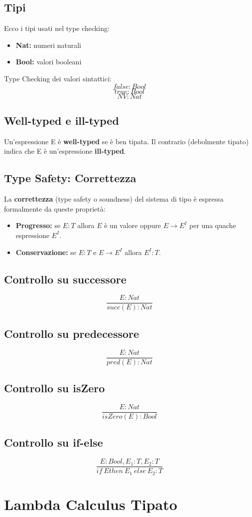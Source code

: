 \documentclass[12pt,a4paper]{article}
\let\oldsection\section
\renewcommand{\section}{\clearpage\oldsection}
\begin{document}
\subsection{Tipi}
Ecco i tipi usati nel type checking:
\begin{itemize}
  \item \textbf{Nat:} numeri naturali
  \item \textbf{Bool:} valori booleani
\end{itemize}
Type Checking dei valori sintattici:
\[
false: Bool
\]
\[
true: Bool
\]
\[
NV: Nat
\]
\subsection{Well-typed e ill-typed}
Un'espressione E è \textbf{well-typed} se è ben tipata. Il contrario (debolmente tipato) indica che E è un'espressione \textbf{ill-typed}.
\subsection{Type Safety: Correttezza}
La \textbf{correttezza} (type safety o soundness) 
del sistema di tipo è espressa formalmente da queste proprietà:
\begin{itemize}
  \item \textbf{Progresso:} se $E:T$ allora $E$ è un valore oppure $E \rightarrow E^I$ per una quache espressione $E^I$.
  \item \textbf{Conservazione:} se $E:T$ e $E \rightarrow E^I$ allora $E^I:T$.
\end{itemize}
\subsection{Controllo su successore}
\[
\frac{E: Nat}{succ(E): Nat}
\]
\subsection{Controllo su predecessore}
\[
\frac{E: Nat}{pred(E): Nat}
\]
\subsection{Controllo su isZero}
\[
\frac{E:Nat}{isZero(E): Bool}
\]
\subsection{Controllo su if-else}
\[
\frac{E: Bool, E_1:T, E_2:T}{if\ E then\ E_1\ else\ E_2:T}
\]

\section{Lambda Calculus Tipato}
\end{document}
